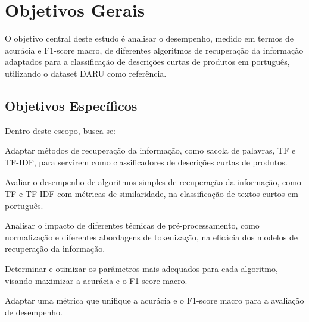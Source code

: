 
\section{Objetivos Gerais}

O objetivo central deste estudo é analisar o desempenho, medido em termos de acurácia e F1-score macro, de diferentes algoritmos de recuperação da informação adaptados para a classificação de descrições curtas de produtos em português, utilizando o dataset DARU como referência.

\subsection{Objetivos Específicos}

Dentro deste escopo, busca-se:

\begin{enumerenumerate}
    \item Adaptar métodos de recuperação da informação, como sacola de palavras, TF e TF-IDF, para servirem como classificadores de descrições curtas de produtos.
    \item Avaliar o desempenho de algoritmos simples de recuperação da informação, como TF e TF-IDF com métricas de similaridade, na classificação de textos curtos em português.
    \item Analisar o impacto de diferentes técnicas de pré-processamento, como normalização e diferentes abordagens de tokenização, na eficácia dos modelos de recuperação da informação.
    \item Determinar e otimizar os parâmetros mais adequados para cada algoritmo, visando maximizar a acurácia e o F1-score macro.
    \item Adaptar uma métrica que unifique a acurácia e o F1-score macro para a avaliação de desempenho.
\end{enumerenumerate}

